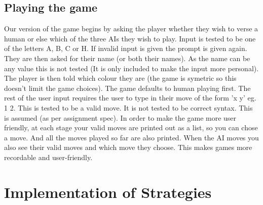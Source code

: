 \documentclass[12pt]{article}
\begin{document}
\subsection{Playing the game}
Our version of the game begins by asking the player whether they wish to verse a human or else which of the three AIs they wish to play. Input is tested to be one of the letters A, B, C or H. If invalid input is given the prompt is given again. They are then asked for their name (or both their names). As the name can be any value this is not tested (It is only included to make the input more personal).
The player is then told which colour they are (the game is symetric so this doesn't limit the game choices). The game defaults to human playing first. The rest of the user input requires the user to type in their move of the form 'x y' eg. 1 2. This is tested to be a valid move. It is not tested to be correct syntax. This is assumed (as per assignment spec).
In order to make the game more user friendly, at each stage your valid moves are printed out as a list, so you can chose a move. And all the moves played so far are also printed. When the AI moves you also see their valid moves and which move they choose. This makes games more recordable and user-friendly.

\section{Implementation of Strategies}
\end{document}
